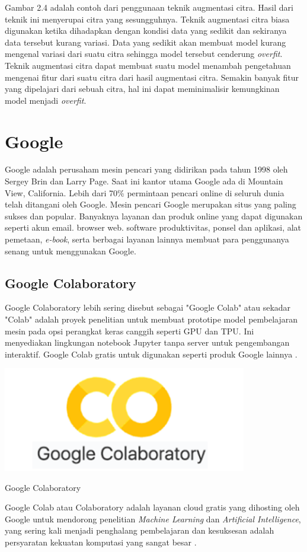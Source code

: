 Gambar 2.4 adalah contoh dari penggunaan teknik augmentasi citra. Hasil dari teknik ini menyerupai citra yang sesungguhnya. Teknik augmentasi citra biasa digunakan ketika dihadapkan dengan kondisi data yang sedikit dan sekiranya data tersebut kurang variasi. Data yang sedikit akan membuat model kurang mengenal variasi dari suatu citra sehingga model tersebut cenderung \textit{overfit}. Teknik augmentasi citra dapat membuat suatu model menambah pengetahuan mengenai fitur dari suatu citra dari hasil augmentasi citra. Semakin banyak fitur yang dipelajari dari sebuah citra, hal ini dapat meminimalisir kemungkinan model menjadi \textit{overfit}.

\section{Google}
Google adalah perusaham mesin pencari yang didirikan pada tahun 1998 oleh Sergey Brin dan Larry Page. Saat ini kantor utama Google ada di Mountain View, California. Lebih dari 70\% permintaan pencari online di seluruh dunia telah ditangani oleh Google.
Mesin pencari Google merupakan situs yang paling sukses dan popular. Banyaknya layanan dan produk online yang dapat digunakan seperti akun email. browser web. software produktivitas, ponsel dan aplikasi, alat pemetaan, \textit{e-book}, serta berbagai layanan lainnya membuat para penggunanya senang untuk menggunakan Google.

\subsection{Google Colaboratory}
Google Colaboratory lebih sering disebut sebagai "Google Colab" atau sekadar "Colab" adalah proyek penelitian untuk membuat prototipe model pembelajaran mesin pada opsi perangkat keras canggih seperti GPU dan TPU. Ini menyediakan lingkungan notebook Jupyter tanpa server untuk pengembangan interaktif. Google Colab gratis untuk digunakan seperti produk Google lainnya \cite{bisong2019}.
\begin{afigure}
    \includegraphics[width=0.8\textwidth, center]{images/Picture5.png}
    \caption{Google Colaboratory}
    \label{fig:google-colab} 
\end{afigure}
Google Colab atau Colaboratory adalah layanan cloud gratis yang dihosting oleh Google untuk mendorong penelitian \textit{Machine Learning} dan \textit{Artificial Intelligence}, yang sering kali menjadi penghalang pembelajaran dan kesuksesan adalah persyaratan kekuatan komputasi yang sangat besar \cite{naik2023}.

